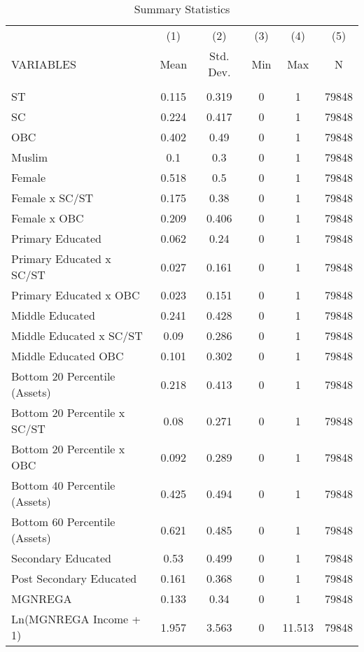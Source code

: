 \documentclass{article}
\begin{document}
\begin{table}[ht]
\caption{Summary Statistics}
\label{table1}
\small
\centering
\begin{tabular}{lccccc} \hline
      & (1) & (2) & (3) & (4) & (5) \\
VARIABLES & Mean & Std. Dev. & Min & Max & N \\ \hline \hline
 &  &  &  &  &  \\
ST & 0.115 & 0.319 & 0 & 1 & 79848\\
SC & 0.224 & 0.417 & 0 & 1 & 79848\\
OBC & 0.402 & 0.49 & 0 & 1 & 79848\\
Muslim & 0.1 & 0.3 & 0 & 1 & 79848\\
Female & 0.518 & 0.5 & 0 & 1 & 79848\\
Female x SC/ST & 0.175 & 0.38 & 0 & 1 & 79848\\
Female x OBC & 0.209 & 0.406 & 0 & 1 & 79848\\
Primary Educated & 0.062 & 0.24 & 0 & 1 & 79848\\
Primary Educated x SC/ST & 0.027 & 0.161 & 0 & 1 & 79848\\
Primary Educated x OBC & 0.023 & 0.151 & 0 & 1 & 79848\\
Middle Educated & 0.241 & 0.428 & 0 & 1 & 79848\\
Middle Educated x SC/ST & 0.09 & 0.286 & 0 & 1 & 79848\\
Middle Educated OBC & 0.101 & 0.302 & 0 & 1 & 79848\\
Bottom 20 Percentile (Assets) & 0.218 & 0.413 & 0 & 1 & 79848\\
Bottom 20 Percentile x SC/ST & 0.08 & 0.271 & 0 & 1 & 79848\\
Bottom 20 Percentile x OBC & 0.092 & 0.289 & 0 & 1 & 79848\\
Bottom 40 Percentile (Assets) & 0.425 & 0.494 & 0 & 1 & 79848\\
Bottom 60 Percentile (Assets) & 0.621 & 0.485 & 0 & 1 & 79848\\
Secondary Educated & 0.53 & 0.499 & 0 & 1 & 79848\\
Post Secondary Educated & 0.161 & 0.368 & 0 & 1 & 79848\\
MGNREGA & 0.133 & 0.34 & 0 & 1 & 79848\\
Ln(MGNREGA Income + 1) & 1.957 & 3.563 & 0 & 11.513 & 79848\\
\hline \hline \end{tabular}
\end{table}
\end{document}
